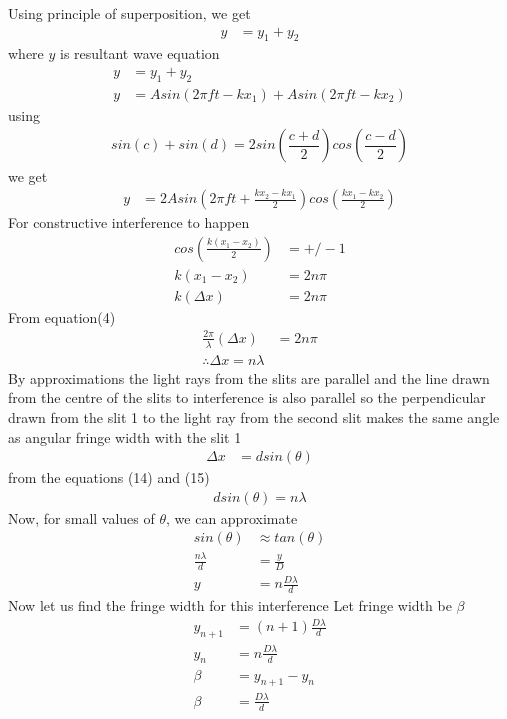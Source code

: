 \documentclass[journal,12pt,twocolumn]{IEEEtran}
\theoremstyle{remark}
\begin{document}
Using principle of superposition, we get
\begin{align}
y &= y_1+y_2
\end{align}
where $y$ is resultant wave equation
\begin{align}
y& = y_1+ y_2\\
y&= A sin(2\pi f t-k x_1)+ A sin (2\pi f t-k x_2)
\end{align}
using
\begin{align}
sin(c)+sin(d)= 2sin(\dfrac{c+d}{2})cos(\dfrac{c-d}{2})
\end{align}
we get
\begin{align}
y&=2Asin(2\pi f t+\frac{k x_2-k x_1}{2})cos(\frac{k x_1- k x_2}{2})
\end{align}
For constructive interference to happen 
\begin{align}
cos(\frac{k(x_1- x_2)}{2})&= +/- 1\\
k(x_1- x_2)&= 2 n \pi\\
k(\Delta x)&= 2 n \pi
\end{align}
From equation(4)
\begin{align}
    \frac{2\pi}{\lambda}(\Delta x)&= 2 n \pi\\
    \therefore \Delta x = n\lambda 
\end{align}
By approximations the light rays from the slits are parallel and the line drawn from the centre of the slits to interference is also parallel so the perpendicular drawn from the slit 1 to the light ray from the second slit makes the same angle as angular fringe width with the slit 1
 \begin{align}
 \Delta x&= d sin(\theta)
 \end{align}
 from the equations (14) and (15)
 \begin{align}
     d sin(\theta)= n\lambda
 \end{align}
 Now, for small values of $\theta$, we can approximate 
\begin{align}
    sin(\theta)&\approx tan(\theta)\\
    \frac{n\lambda}{d}&=\frac{y}{D}\\
    y&=n\frac{D \lambda}{d}
\end{align}
 Now let us find the fringe width for this interference
 Let fringe width be $\beta$
 \begin{align}
 y_{n+1}&=(n+1)\frac{D\lambda}{d}\\
     y_n&=n\frac{D\lambda}{d}\\
     \beta&= y_{n+1}-y_n\\
     \beta&=\frac{D\lambda}{d}
 \end{align}
\end{document}
